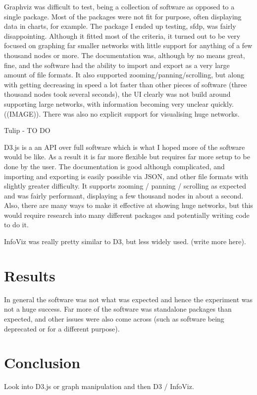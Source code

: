 \documentclass{l4proj}
\begin{document}
Graphviz was difficult to test, being a collection of software as opposed to a single package. Most of the packages were not fit for purpose, often displaying data in charts, for example. The package I ended up testing, sfdp, was fairly disappointing. Although it fitted most of the criteria, it turned out to be very focused on graphing far smaller networks with little support for anything of a few thousand nodes or more. The documentation was, although by no means great, fine, and the software had the ability to import and export as a very large amount of file formats. It also supported zooming/panning/scrolling, but along with getting decreasing in speed a lot faster than other pieces of software (three thousand nodes took several seconds), the UI clearly was not build around supporting large networks, with information becoming very unclear quickly.  ((IMAGE)). There was also no explicit support for visualising huge networks.

Tulip - TO DO

D3.js is a an API over full software which is what I hoped more of the software would be like. As a result it is far more flexible but requires far more setup to be done by the user. The documentation is good although complicated, and importing and exporting is easily possible via JSON, and other file formats with slightly greater difficulty. It supports zooming / panning / scrolling as expected and was fairly performant, displaying a few thousand nodes in about a second. Also, there are many ways to make it effective at showing huge networks, but this would require research into many different packages and potentially writing code to do it.

InfoViz was really pretty similar to D3, but less widely used. (write more here).


\section{Results}
In general the software was not what was expected and hence the experiment was not a huge success. Far more of the software was standalone packages than expected, and other issues were also come across (such as software being deprecated or for a different purpose). 

\section{Conclusion}

Look into D3.js or graph manipulation and then D3 / InfoViz.
\end{document}
